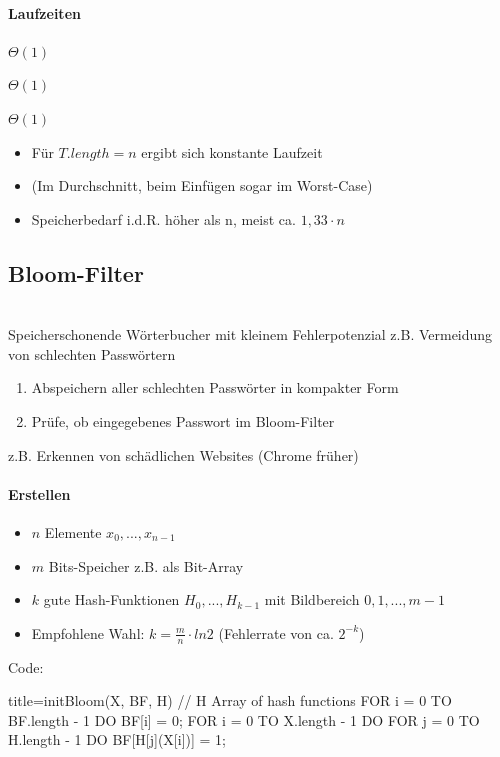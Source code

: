 \documentclass[
    ngerman,
    color=3b,
    load_common, %
    summary,
    boxarc,
]{tuda_summary}
\begin{document}
\paragraph{Laufzeiten}
\begin{description}[leftmargin=2.3cm]
    \item[Einfügen] $\Theta(1)$
    \item[Löschen] $\Theta(1)$
    \item[Suchen] $\Theta(1)$
\end{description}
\begin{itemize}
    \item Für $T.length = n$ ergibt sich konstante Laufzeit
    \item (Im Durchschnitt, beim Einfügen sogar im Worst-Case)
    \item Speicherbedarf i.d.R. höher als n, meist ca. $1,33 \cdot n$
\end{itemize}

\subsection{Bloom-Filter}\label{Bloom-Filter}
\begin{idea}\mbox{}\\
    Speicherschonende Wörterbucher mit kleinem Fehlerpotenzial
    z.B. Vermeidung von schlechten Passwörtern
    \begin{enumerate}
        \item Abspeichern aller schlechten Passwörter in kompakter Form
        \item Prüfe, ob eingegebenes Passwort im Bloom-Filter
    \end{enumerate}
    z.B. Erkennen von schädlichen Websites (Chrome früher)
\end{idea}

\paragraph{Erstellen}\mbox{}
\begin{itemize}
    \item $n$ Elemente $x_0,...,x_{n-1}$
    \item $m$ Bits-Speicher z.B. als Bit-Array
    \item $k$ gute Hash-Funktionen $H_0,...,H_{k-1}$ mit Bildbereich $0,1,...,m-1$
    \item Empfohlene Wahl: $k = \frac{m}{n} \cdot ln2$ (Fehlerrate von ca. $2^{-k}$)
\end{itemize}
Code:
\begin{codeBlock}[autogobble]{title={initBloom(X, BF, H) // H Array of hash functions}}
FOR i = 0 TO BF.length - 1 DO 
    BF[i] = 0;
FOR i = 0 TO X.length - 1 DO
    FOR j = 0 TO H.length - 1 DO
        BF[H[j](X[i])] = 1;
\end{codeBlock}
\end{document}

